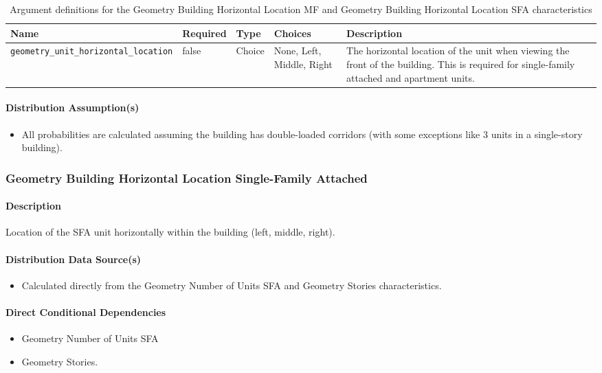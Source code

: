\begin{longtable}[]{ |p{}|p{1.5cm}|p{1.1cm}|p{1.4cm}|p{6cm}| }
\caption{Argument definitions for the Geometry Building Horizontal Location MF and Geometry Building Horizontal Location SFA characteristics} \label{table:hc_arg_def_geom_build_hor_loc_mf}  \\
\toprule\noalign{}
Name & Required & Type & Choices & Description \\
\midrule\noalign{}
\endhead
\bottomrule\noalign{}
\endlastfoot
\texttt{geometry\_unit\_horizontal\_location} & false & Choice & None,
Left, Middle, Right & The horizontal location of the unit when viewing
the front of the building. This is required for single-family attached
and apartment units. \\
\end{longtable}

\paragraph{Distribution Assumption(s)}
\begin{itemize}
    \item All probabilities are calculated assuming the building has double-loaded corridors (with some exceptions like 3 units in a single-story building).
\end{itemize}

\subsubsection{Geometry Building Horizontal Location Single-Family Attached}
\paragraph{Description}
Location of the SFA unit horizontally within the building (left, middle, right).

\paragraph{Distribution Data Source(s)}
\begin{itemize}
    \item Calculated directly from the Geometry Number of Units SFA and Geometry Stories characteristics.
\end{itemize}

\paragraph{Direct Conditional Dependencies}
\begin{itemize}
    \item Geometry Number of Units SFA
    \item Geometry Stories.
\end{itemize}


